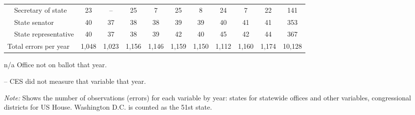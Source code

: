 \begin{table}[!htbp]
{\begin{threeparttable}
\begin{tabular}{lcccccccccc}
~~Secretary of state & 23 & -- & 25 & 7 & 25 & 8 & 24 & 7 & 22 & 141 \\
~~State senator & 40 & 37 & 38 & 38 & 39 & 39 & 40 & 41 & 41 & 353 \\
~~State representative & 40 & 37 & 38 & 39 & 42 & 40 & 45 & 42 & 44 & 367 \\
\midrule
Total errors per year & 1,048 & 1,023 & 1,156 & 1,146 & 1,159 & 1,150 & 1,112 & 1,160 & 1,174 & 10,128 \\
\bottomrule
\end{tabular}
\begin{tablenotes}
\footnotesize
\item n/a Office not on ballot that year.
\item -- CES did not measure that variable that year.
\item \textit{Note:} Shows the number of observations (errors) for each variable by year: states for statewide offices and other variables, congressional districts for US House. Washington D.C. is counted as the 51st state.
\end{tablenotes}
\end{threeparttable}%
}
\end{table}